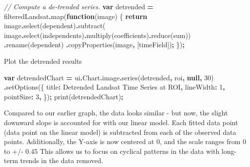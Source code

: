 \documentclass[
]{article}
\newenvironment{Shaded}{\begin{snugshade}}{\end{snugshade}}
\newcommand{\AttributeTok}[1]{\textcolor[rgb]{0.77,0.63,0.00}{#1}}
\newcommand{\CommentTok}[1]{\textcolor[rgb]{0.56,0.35,0.01}{\textit{#1}}}
\newcommand{\ControlFlowTok}[1]{\textcolor[rgb]{0.13,0.29,0.53}{\textbf{#1}}}
\newcommand{\DataTypeTok}[1]{\textcolor[rgb]{0.13,0.29,0.53}{#1}}
\newcommand{\DecValTok}[1]{\textcolor[rgb]{0.00,0.00,0.81}{#1}}
\newcommand{\FunctionTok}[1]{\textcolor[rgb]{0.00,0.00,0.00}{#1}}
\newcommand{\KeywordTok}[1]{\textcolor[rgb]{0.13,0.29,0.53}{\textbf{#1}}}
\newcommand{\NormalTok}[1]{#1}
\newcommand{\OperatorTok}[1]{\textcolor[rgb]{0.81,0.36,0.00}{\textbf{#1}}}
\newcommand{\StringTok}[1]{\textcolor[rgb]{0.31,0.60,0.02}{#1}}
\begin{document}
\begin{Shaded}
\begin{Highlighting}[]
\CommentTok{// Compute a de{-}trended series.}
\KeywordTok{var}\NormalTok{ detrended }\OperatorTok{=}\NormalTok{ filteredLandsat}\OperatorTok{.}\FunctionTok{map}\NormalTok{(}\KeywordTok{function}\NormalTok{(image) \{}
\ControlFlowTok{return}\NormalTok{ image}\OperatorTok{.}\FunctionTok{select}\NormalTok{(dependent)}\OperatorTok{.}\FunctionTok{subtract}\NormalTok{(}
\NormalTok{       image}\OperatorTok{.}\FunctionTok{select}\NormalTok{(independents)}\OperatorTok{.}\FunctionTok{multiply}\NormalTok{(coefficients)}\OperatorTok{.}\FunctionTok{reduce}\NormalTok{(}\StringTok{\textquotesingle{}sum\textquotesingle{}}\NormalTok{))}
       \OperatorTok{.}\FunctionTok{rename}\NormalTok{(dependent)}
       \OperatorTok{.}\FunctionTok{copyProperties}\NormalTok{(image}\OperatorTok{,}\NormalTok{ [timeField])}\OperatorTok{;}
\NormalTok{       \})}\OperatorTok{;}
\end{Highlighting}
\end{Shaded}

Plot the detrended results

\begin{Shaded}
\begin{Highlighting}[]
\KeywordTok{var}\NormalTok{ detrendedChart }\OperatorTok{=}\NormalTok{ ui}\OperatorTok{.}\AttributeTok{Chart}\OperatorTok{.}\AttributeTok{image}\OperatorTok{.}\FunctionTok{series}\NormalTok{(detrended}\OperatorTok{,}\NormalTok{ roi}\OperatorTok{,} \KeywordTok{null}\OperatorTok{,} \DecValTok{30}\NormalTok{)}
\OperatorTok{.}\FunctionTok{setOptions}\NormalTok{(\{}
  \DataTypeTok{title}\OperatorTok{:} \StringTok{\textquotesingle{}Detrended Landsat Time Series at ROI\textquotesingle{}}\OperatorTok{,}
  \DataTypeTok{lineWidth}\OperatorTok{:} \DecValTok{1}\OperatorTok{,}
  \DataTypeTok{pointSize}\OperatorTok{:} \DecValTok{3}\OperatorTok{,}
\NormalTok{\})}\OperatorTok{;}
\FunctionTok{print}\NormalTok{(detrendedChart)}\OperatorTok{;}
\end{Highlighting}
\end{Shaded}

Compared to our earlier graph, the data looks similar - but now, the slight downward slope is accounted for with our linear model. Each fitted data point (data point on the linear model) is subtracted from each of the observed data points. Additionally, the Y-axis is now centered at 0, and the scale ranges from 0 to +/- 0.45 This allows us to focus on cyclical patterns in the data with long-term trends in the data removed.
\end{document}
